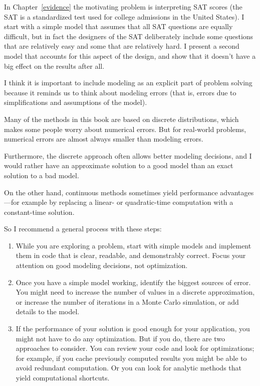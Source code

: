 \documentclass[12pt]{book}
\theoremstyle{exercise}
\begin{document}
In Chapter~\ref{evidence} the motivating problem is interpreting SAT
scores (the SAT is a standardized test used for college admissions in
the United States).  I start with a simple model that assumes that all
SAT questions are equally difficult, but in fact the designers of the
SAT deliberately include some questions that are relatively easy and
some that are relatively hard.  I present a second model that accounts
for this aspect of the design, and show that it doesn't have a big
effect on the results after all.

I think it is important to include modeling as an explicit part
of problem solving because it reminds us to think about modeling
errors (that is, errors due to simplifications and assumptions
of the model).

Many of the methods in this book are based on discrete distributions,
which makes some people worry about numerical errors.  But for
real-world problems, numerical errors are almost always
smaller than modeling errors.

Furthermore, the discrete approach often allows better modeling
decisions, and I would rather have an approximate solution
to a good model than an exact solution to a bad model.

On the other hand, continuous methods sometimes yield performance
advantages---for example by replacing a linear- or quadratic-time
computation with a constant-time solution.

So I recommend a general process with these steps:

\begin{enumerate}

\item While you are exploring a problem, start with simple models and
  implement them in code that is clear, readable, and demonstrably
  correct.  Focus your attention on good modeling decisions, not
  optimization.

\item Once you have a simple model working, identify the
  biggest sources of error.  You might need to increase the number of
  values in a discrete approximation, or increase the number of
  iterations in a Monte Carlo simulation, or add details to the model.

\item If the performance of your solution is good enough for your
  application, you might not have to do any optimization.  But if you
  do, there are two approaches to consider.  You can review your code
  and look for optimizations; for example, if you cache previously
  computed results you might be able to avoid redundant computation.
  Or you can look for analytic methods that yield computational
  shortcuts.

\end{enumerate}
\end{document}
